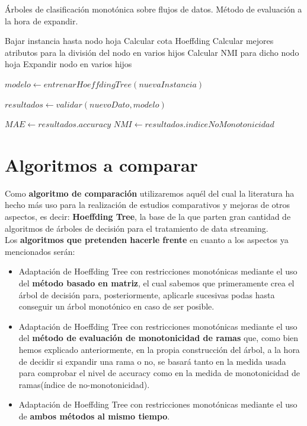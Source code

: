 \begin{algorithm}[H]
	\caption{Árboles de clasificación monotónica sobre flujos de datos. Método de evaluación a la hora de expandir.}\label{euclid}
	\begin{algorithmic}[2]
			\State Bajar instancia hasta nodo hoja
			\State Calcular cota Hoeffding
			\State Calcular mejores atributos para la división del nodo en varios hijos
			\State Calcular NMI para dicho nodo hoja
				\State Expandir nodo en varios hijos \EndIf
		\EndProcedure
		
		\State $modelo \gets entrenarHoeffdingTree(nuevaInstancia)$
		\EndWhile
		\EndProcedure
		
		\State $resultados \gets validar(nuevoDato, modelo)$
		\EndWhile
		
		\State $MAE \gets resultados.accuracy$
		\State $NMI \gets resultados.indiceNoMonotonicidad$
		
		\EndProcedure
	\end{algorithmic}
\end{algorithm}

\section{Algoritmos a comparar}

Como \textbf{algoritmo de comparación} utilizaremos aquél del cual la literatura ha hecho más uso para la realización de estudios comparativos y mejoras de otros aspectos, es decir: \textbf{Hoeffding Tree}, la base de la que parten gran cantidad de algoritmos de árboles de decisión para el tratamiento de data streaming.\\

Los \textbf{algoritmos que pretenden hacerle frente} en cuanto a los aspectos ya mencionados serán:
\begin{itemize}
	\item Adaptación de Hoeffding Tree con restricciones monotónicas mediante el uso del \textbf{método basado en matriz}, el cual sabemos que primeramente crea el árbol de decisión para, posteriormente, aplicarle sucesivas podas hasta conseguir un árbol monotónico en caso de ser posible.
	\item Adaptación de Hoeffding Tree con restricciones monotónicas mediante el uso del \textbf{método de evaluación de monotonicidad de ramas} que, como bien hemos explicado anteriormente, en la propia construcción del árbol, a la hora de decidir si expandir una rama o no, se basará tanto en la medida usada para comprobar el nivel de accuracy como en la medida de monotonicidad de ramas(índice de no-monotonicidad).
	\item Adaptación de Hoeffding Tree con restricciones monotónicas mediante el uso de\textbf{ ambos métodos al mismo tiempo}.
\end{itemize}











\newpage


